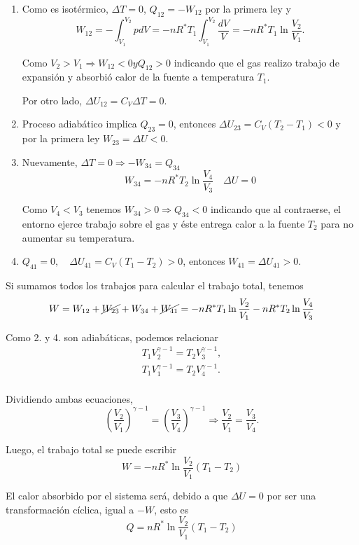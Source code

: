 \documentclass[openany]{book}
\begin{document}
\begin{enumerate}
	\item Como es isotérmico, $\Delta T=0$, $Q_{12}=-W_{12}$ por la primera ley y
	      \begin{equation*}
		      W_{12}=-\displaystyle\int_{V_1}^{V_2}pdV=-nR^*T_1\displaystyle\int_{V_1}^{V_2}\frac{dV}{V}=-nR^*T_1\ln{\frac{V_2}{V_1}}.
	      \end{equation*}
	      \par Como $V_2>V_1\Rightarrow W_{12}<0 y Q_{12}>0$ indicando que el gas realizo trabajo de expansión y absorbió calor de la fuente a temperatura $T_1$.
	      \par Por otro lado, $\Delta U_{12}=C_V\Delta T=0$.
	\item Proceso adiabático implica $Q_{23}=0$, entonces $\Delta U_{23}=C_V(T_2-T_1)<0$ y por la primera ley $W_{23}=\Delta U<0$.
	\item Nuevamente, $\Delta T=0\Rightarrow-W_{34}=Q_{34}$
	      \begin{equation*}
		      W_{34}=-nR^*T_2\ln{\frac{V_4}{V_3}}\quad \Delta U=0
	      \end{equation*}
	      \par Como $V_4<V_3$ tenemos $W_{34}>0\Rightarrow Q_{34}<0$ indicando que al contraerse, el entorno ejerce trabajo sobre el gas y éste entrega calor a la fuente $T_2$ para no aumentar su temperatura.
	\item $Q_{41}=0,\quad\Delta U_{41}=C_V(T_1-T_2)>0$, entonces $W_{41}=\Delta U_{41}>0$.
\end{enumerate}
\par Si sumamos todos los trabajos para calcular el trabajo total, tenemos
\begin{equation*}
	W=W_{12}+\cancel{W_{23}}+W_{34}+\cancel{W_{41}}=-nR^*T_1\ln{\frac{V_2}{V_1}}-nR^*T_2\ln{\frac{V_4}{V_3}}
\end{equation*}
\par Como 2. y 4. son adiabáticas, podemos relacionar
\begin{gather*}
	T_1V_2^{\gamma-1}=T_2V_3^{\gamma-1},\\
	T_1V_1^{\gamma-1}=T_2V_4^{\gamma-1}.\\
\end{gather*}
\par Dividiendo ambas ecuaciones,
\begin{equation*}
	\left(\frac{V_2}{V_1}\right)^{\gamma-1}=\left(\frac{V_3}{V_4}\right)^{\gamma-1}\Rightarrow\frac{V_2}{V_1}=\frac{V_3}{V_4}.
\end{equation*}
\par Luego, el trabajo total se puede escribir
\begin{equation*}
	W=-nR^*\ln{\frac{V_2}{V_1}}(T_1-T_2)
\end{equation*}
\par El calor absorbido por el sistema será, debido a que $\Delta U=0$ por ser una transformación cíclica, igual a $-W$, esto es
\begin{equation*}
	Q=nR^*\ln{\frac{V_2}{V_1}}(T_1-T_2)
\end{equation*}
\end{document}
